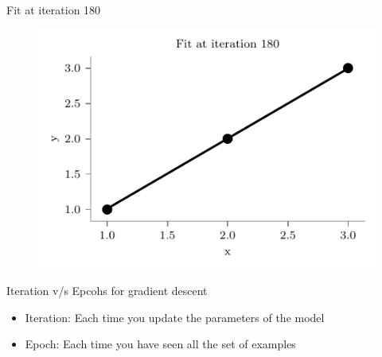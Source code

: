 \documentclass{beamer}
\begin{document}
\begin{frame}{Fit at iteration 180}
\begin{figure}
	\centering
	\includegraphics[width=0.7\linewidth]{fit-iteration-180.pdf}
\end{figure}
\end{frame}

%		
%		
%		

	

	\begin{frame}{Iteration v/s Epcohs for gradient descent}
	\begin{itemize}[<+->]
		\item Iteration: Each time you update the parameters of the model
		\item Epoch: Each time you have seen all the set of examples
	\end{itemize}
\end{frame}
	
	

	
\end{document}
